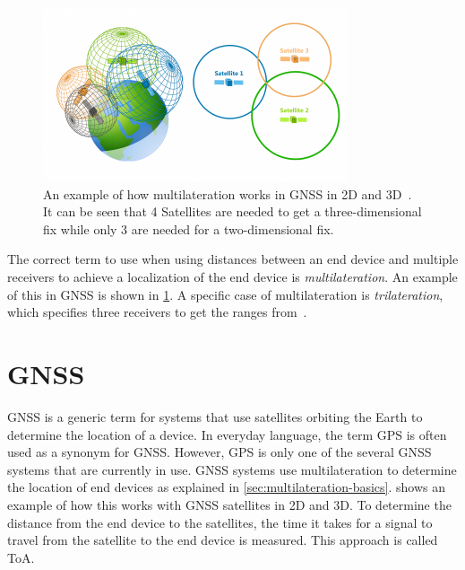 \begin{figure}[htbp]
    \centering
    \includegraphics[width=0.8\textwidth]{pictures/multilateration/gps_multilateration.png}
    \caption{
        An example of how multilateration works in \ac{GNSS} in 2D and 3D~\protect\cite{gisgeography_how_2018}.
        It can be seen that 4 Satellites are needed to get a three-dimensional fix while only 3 are needed for a two-dimensional fix.
    }\label{pic:multilateration-gps-2d-3d-example}
\end{figure}

The correct term to use when using distances between an end device and multiple receivers to achieve a localization of the end device is \emph{multilateration}.
An example of this in \ac{GNSS} is shown in \cref{pic:multilateration-gps-2d-3d-example}.
A specific case of multilateration is \emph{trilateration}, which specifies three receivers to get the ranges from~\cite{ruiz_efficient_2013}.

\section{\acf{GNSS}}

\ac{GNSS} is a generic term for systems that use satellites orbiting the Earth to determine the location of a device.
In everyday language, the term \ac{GPS} is often used as a synonym for \ac{GNSS}.
However, \ac{GPS} is only one of the several \ac{GNSS} systems that are currently in use.
\ac{GNSS} systems use multilateration to determine the location of end devices as explained in \cref{sec:multilateration-basics}.
 shows an example of how this works with \ac{GNSS} satellites in 2D and 3D.
To determine the distance from the end device to the satellites, the time it takes for a signal to travel from the satellite to the end device is measured.
This approach is called \acf{ToA}.

